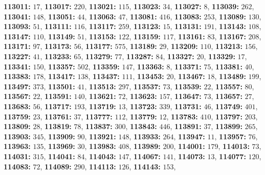 \textsf{\bfseries 113011:} $17$, \textsf{\bfseries 113017:} $220$, \textsf{\bfseries 113021:} $115$, \textsf{\bfseries 113023:} $34$, \textsf{\bfseries 113027:} $8$, \textsf{\bfseries 113039:} $262$, \textsf{\bfseries 113041:} $148$, \textsf{\bfseries 113051:} $44$, \textsf{\bfseries 113063:} $47$, \textsf{\bfseries 113081:} $416$, \textsf{\bfseries 113083:} $253$, \textsf{\bfseries 113089:} $130$, \textsf{\bfseries 113093:} $51$, \textsf{\bfseries 113111:} $116$, \textsf{\bfseries 113117:} $259$, \textsf{\bfseries 113123:} $15$, \textsf{\bfseries 113131:} $191$, \textsf{\bfseries 113143:} $108$, \textsf{\bfseries 113147:} $110$, \textsf{\bfseries 113149:} $51$, \textsf{\bfseries 113153:} $122$, \textsf{\bfseries 113159:} $117$, \textsf{\bfseries 113161:} $83$, \textsf{\bfseries 113167:} $208$, \textsf{\bfseries 113171:} $97$, \textsf{\bfseries 113173:} $56$, \textsf{\bfseries 113177:} $575$, \textsf{\bfseries 113189:} $29$, \textsf{\bfseries 113209:} $110$, \textsf{\bfseries 113213:} $156$, \textsf{\bfseries 113227:} $41$, \textsf{\bfseries 113233:} $65$, \textsf{\bfseries 113279:} $77$, \textsf{\bfseries 113287:} $84$, \textsf{\bfseries 113327:} $20$, \textsf{\bfseries 113329:} $17$, \textsf{\bfseries 113341:} $150$, \textsf{\bfseries 113357:} $502$, \textsf{\bfseries 113359:} $147$, \textsf{\bfseries 113363:} $8$, \textsf{\bfseries 113371:} $75$, \textsf{\bfseries 113381:} $40$, \textsf{\bfseries 113383:} $178$, \textsf{\bfseries 113417:} $138$, \textsf{\bfseries 113437:} $111$, \textsf{\bfseries 113453:} $20$, \textsf{\bfseries 113467:} $18$, \textsf{\bfseries 113489:} $199$, \textsf{\bfseries 113497:} $373$, \textsf{\bfseries 113501:} $41$, \textsf{\bfseries 113513:} $297$, \textsf{\bfseries 113537:} $73$, \textsf{\bfseries 113539:} $22$, \textsf{\bfseries 113557:} $80$, \textsf{\bfseries 113567:} $22$, \textsf{\bfseries 113591:} $140$, \textsf{\bfseries 113621:} $72$, \textsf{\bfseries 113623:} $157$, \textsf{\bfseries 113647:} $73$, \textsf{\bfseries 113657:} $27$, \textsf{\bfseries 113683:} $56$, \textsf{\bfseries 113717:} $193$, \textsf{\bfseries 113719:} $13$, \textsf{\bfseries 113723:} $339$, \textsf{\bfseries 113731:} $46$, \textsf{\bfseries 113749:} $401$, \textsf{\bfseries 113759:} $23$, \textsf{\bfseries 113761:} $37$, \textsf{\bfseries 113777:} $112$, \textsf{\bfseries 113779:} $12$, \textsf{\bfseries 113783:} $410$, \textsf{\bfseries 113797:} $203$, \textsf{\bfseries 113809:} $28$, \textsf{\bfseries 113819:} $78$, \textsf{\bfseries 113837:} $300$, \textsf{\bfseries 113843:} $446$, \textsf{\bfseries 113891:} $37$, \textsf{\bfseries 113899:} $265$, \textsf{\bfseries 113903:} $345$, \textsf{\bfseries 113909:} $90$, \textsf{\bfseries 113921:} $148$, \textsf{\bfseries 113933:} $264$, \textsf{\bfseries 113947:} $11$, \textsf{\bfseries 113957:} $76$, \textsf{\bfseries 113963:} $135$, \textsf{\bfseries 113969:} $30$, \textsf{\bfseries 113983:} $408$, \textsf{\bfseries 113989:} $200$, \textsf{\bfseries 114001:} $179$, \textsf{\bfseries 114013:} $73$, \textsf{\bfseries 114031:} $315$, \textsf{\bfseries 114041:} $84$, \textsf{\bfseries 114043:} $147$, \textsf{\bfseries 114067:} $141$, \textsf{\bfseries 114073:} $13$, \textsf{\bfseries 114077:} $120$, \textsf{\bfseries 114083:} $72$, \textsf{\bfseries 114089:} $290$, \textsf{\bfseries 114113:} $126$, \textsf{\bfseries 114143:} $153$, 
